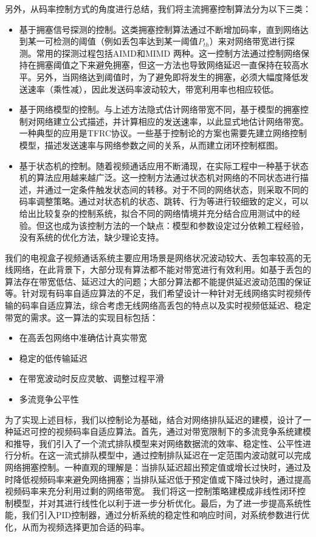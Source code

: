 另外，从码率控制方式的角度进行总结，我们将主流拥塞控制算法分为以下三类：
\begin{itemize}
    \item 基于拥塞信号探测的控制。这类拥塞控制算法通过不断增加码率，直到网络达到某一可检测的阈值（例如丢包率达到某一阈值$P_{th}$\cite{wu2000end}）来对网络带宽进行探测。常用的探测过程包括AIMD和MIMD 两种。这一控制方法通过控制网络保持在拥塞阈值之下来避免拥塞，但这一方法也导致网络延迟一直保持在较高水平。另外，当网络达到阈值时，为了避免即将发生的拥塞，必须大幅度降低发送速率（乘性减），因此发送码率波动较大，带宽利用率也相应较低。
    \item 基于网络模型的控制。与上述方法隐式估计网络带宽不同，基于模型的拥塞控制对网络建立公式描述，并计算相应的发送速率，以此显式地估计网络带宽。一种典型的应用是TFRC协议。一些基于控制论的方案也需要先建立网络控制模型，描述发送速率与网络参数之间的关系，从而建立闭环控制框图。
    \item 基于状态机的控制。随着视频通话应用不断涌现，在实际工程中一种基于状态机的算法应用越来越广泛。这一控制方法通过状态机对网络的不同状态进行描述，并通过一定条件触发状态间的转移。对于不同的网络状态，则采取不同的码率调整策略。通过对状态机的状态、跳转、行为等进行较细致的定义，可以给出比较复杂的控制系统，拟合不同的网络情境并充分结合应用测试中的经验。但这也成为该控制方法的一个缺点：模型和参数设定过分依赖工程经验，没有系统的优化方法，缺少理论支持。
\end{itemize}

我们的电视盒子视频通话系统主要应用场景是网络状况波动较大、丢包率较高的无线网络，在此背景下，大部分现有算法都不能对带宽进行有效利用。如基于丢包的算法存在带宽低估、延迟过大的问题；大部分算法都不能提供延迟波动范围的保证等。针对现有码率自适应算法的不足，我们希望设计一种针对无线网络实时视频传输的码率自适应算法，综合考虑无线网络高丢包的特点以及实时视频低延迟、稳定带宽的需求。这一算法的实现目标包括：
\begin{itemize}
    \item 在高丢包网络中准确估计真实带宽
    \item 稳定的低传输延迟
    \item 在带宽波动时反应灵敏、调整过程平滑
    \item 多流竞争公平性
\end{itemize}

为了实现上述目标，我们以控制论为基础，结合对网络排队延迟的建模，设计了一种延迟可控的视频码率自适应算法。首先，通过对带宽限制下的多流竞争系统建模和推导，我们引入了一个流式排队模型来对网络数据流的效率、稳定性、公平性进行分析。在这一流式排队模型中，通过控制排队延迟在一定范围内波动就可以完成网络拥塞控制。一种直观的理解是：当排队延迟超出预定值或增长过快时，通过及时降低视频码率来避免网络拥塞；当排队延迟低于预定值或下降过快时，通过提高视频码率来充分利用过剩的网络带宽。
我们将这一控制策略建模成非线性闭环控制模型，并对其进行线性化以利于进一步分析优化。最后，为了进一步提高系统性能，我们引入PID控制器，通过分析系统的稳定性和响应时间，对系统参数进行优化，从而为视频选择更加合适的码率。

